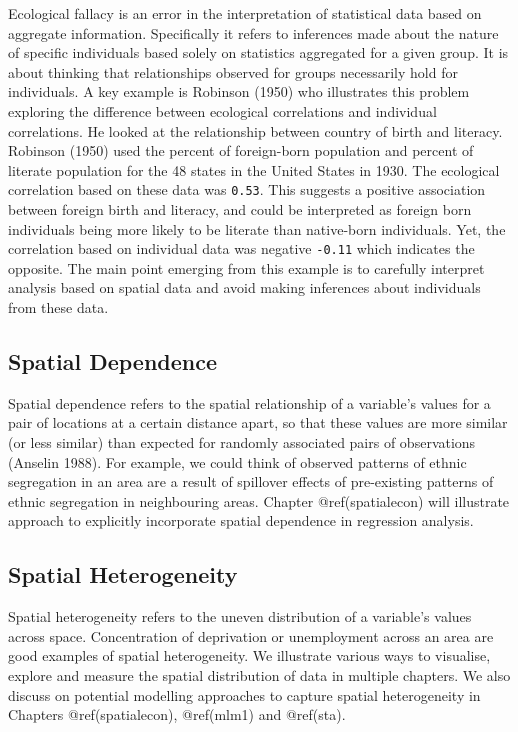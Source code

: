 \documentclass[
  letterpaper,
  krantz2]{style/krantz}
\begin{document}
Ecological fallacy is an error in the interpretation of statistical data
based on aggregate information. Specifically it refers to inferences
made about the nature of specific individuals based solely on statistics
aggregated for a given group. It is about thinking that relationships
observed for groups necessarily hold for individuals. A key example is
Robinson (1950) who illustrates this problem exploring the difference
between ecological correlations and individual correlations. He looked
at the relationship between country of birth and literacy. Robinson
(1950) used the percent of foreign-born population and percent of
literate population for the 48 states in the United States in 1930. The
ecological correlation based on these data was \texttt{0.53}. This
suggests a positive association between foreign birth and literacy, and
could be interpreted as foreign born individuals being more likely to be
literate than native-born individuals. Yet, the correlation based on
individual data was negative \texttt{-0.11} which indicates the
opposite. The main point emerging from this example is to carefully
interpret analysis based on spatial data and avoid making inferences
about individuals from these data.

\hypertarget{spatial-dependence}{%
\subsection{Spatial Dependence}\label{spatial-dependence}}

Spatial dependence refers to the spatial relationship of a variable's
values for a pair of locations at a certain distance apart, so that
these values are more similar (or less similar) than expected for
randomly associated pairs of observations (Anselin 1988). For example,
we could think of observed patterns of ethnic segregation in an area are
a result of spillover effects of pre-existing patterns of ethnic
segregation in neighbouring areas. Chapter @ref(spatialecon) will
illustrate approach to explicitly incorporate spatial dependence in
regression analysis.

\hypertarget{spatial-heterogeneity}{%
\subsection{Spatial Heterogeneity}\label{spatial-heterogeneity}}

Spatial heterogeneity refers to the uneven distribution of a variable's
values across space. Concentration of deprivation or unemployment across
an area are good examples of spatial heterogeneity. We illustrate
various ways to visualise, explore and measure the spatial distribution
of data in multiple chapters. We also discuss on potential modelling
approaches to capture spatial heterogeneity in Chapters
@ref(spatialecon), @ref(mlm1) and @ref(sta).
\end{document}
